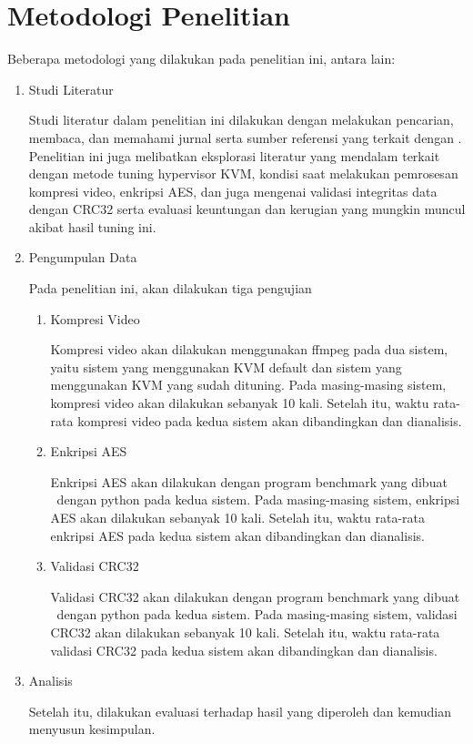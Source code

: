 \section{Metodologi Penelitian}
Beberapa metodologi yang dilakukan pada penelitian ini, antara lain:
\begin{enumerate}
  \item Studi Literatur
  
  Studi literatur dalam penelitian ini dilakukan dengan melakukan pencarian, membaca, dan memahami jurnal serta sumber referensi yang terkait dengan \cc. Penelitian ini juga melibatkan eksplorasi literatur yang mendalam terkait dengan metode tuning hypervisor KVM, kondisi saat melakukan pemrosesan kompresi video, enkripsi AES, dan juga mengenai validasi integritas data dengan CRC32 serta evaluasi keuntungan dan kerugian yang mungkin muncul akibat hasil tuning ini.
  
  \item Pengumpulan Data
  
  Pada penelitian ini, akan dilakukan tiga pengujian
  \begin{enumerate}
    \item Kompresi Video
    
    Kompresi video akan dilakukan menggunakan ffmpeg pada dua sistem, yaitu sistem yang menggunakan KVM default dan sistem yang menggunakan KVM yang sudah dituning. Pada masing-masing sistem, kompresi video akan dilakukan sebanyak 10 kali. Setelah itu, waktu rata-rata kompresi video pada kedua sistem akan dibandingkan dan dianalisis.

    \item Enkripsi AES
    
    Enkripsi AES akan dilakukan dengan program benchmark yang dibuat \saya\ dengan python pada kedua sistem. Pada masing-masing sistem, enkripsi AES akan dilakukan sebanyak 10 kali. Setelah itu, waktu rata-rata enkripsi AES pada kedua sistem akan dibandingkan dan dianalisis.

    \item Validasi CRC32
    
    Validasi CRC32 akan dilakukan dengan program benchmark yang dibuat \saya\ dengan python pada kedua sistem. Pada masing-masing sistem, validasi CRC32 akan dilakukan sebanyak 10 kali. Setelah itu, waktu rata-rata validasi CRC32 pada kedua sistem akan dibandingkan dan dianalisis.
  \end{enumerate}
  
  \item Analisis
  
  Setelah itu, dilakukan evaluasi terhadap hasil yang diperoleh dan kemudian menyusun kesimpulan.
\end{enumerate}


